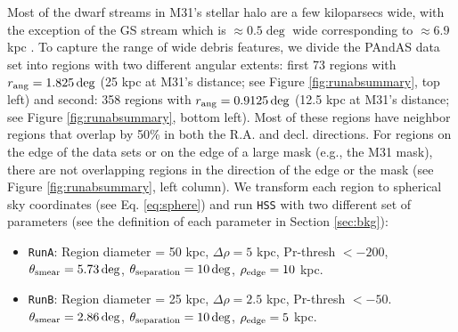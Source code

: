 \documentclass[twocolumn]{aastex631}
\begin{document}
Most of the dwarf streams in M31's stellar halo are a few kiloparsecs wide, with the exception of the GS stream which is ${\approx}0.5\deg$ wide corresponding to ${\approx}6.9$ kpc \citep{mc03}. To capture the range of wide debris features, we divide the PAndAS data set into regions with two different angular extents: first 73 regions with $r_{\rm ang} = 1.825\deg$ (25 kpc at M31's distance; see Figure \ref{fig:runabsummary}, top left)  and second: 358 regions with $r_{\rm ang} = 0.9125 \deg$ (12.5 kpc at M31's distance; see Figure \ref{fig:runabsummary}, bottom left). Most of these regions have neighbor regions that overlap by 50\% in both the R.A. and decl. directions. For regions on the edge of the data sets or on the edge of a large mask (e.g., the M31 mask), there are not overlapping regions in the direction of the edge or the mask (see Figure \ref{fig:runabsummary}, left column).
We transform each region to spherical sky coordinates (see Eq. \ref{eq:sphere}) and run \texttt{HSS} with two different set of parameters (see the definition of each parameter in Section \ref{sec:bkg}):
\begin{itemize}
\item \texttt{RunA}: Region diameter = 50 kpc,
$\Delta \rho = 5$ kpc, Pr-thresh $< -200$,
 $\theta_{\rm smear} = 5.73\deg$, $\theta_{\rm separation} = 10\deg$, $\rho_{\rm edge} = 10$ kpc.
\item \texttt{RunB}: Region diameter = 25 kpc, $\Delta \rho = 2.5$ kpc, Pr-thresh $< -50$.
 $\theta_{\rm smear} = 2.86\deg$, $\theta_{\rm separation} = 10\deg$, $\rho_{\rm edge} = 5$ kpc.
\end{itemize}
\end{document}
